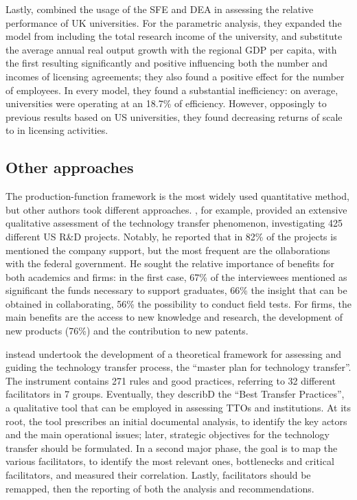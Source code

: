 Lastly, \citet{Chapple2005} combined the usage of the SFE and DEA in assessing the relative performance of UK universities. For the parametric analysis, they expanded the model from \citet{Siegel2003a} including the total research income of the university, and substitute the average annual real output growth with the regional GDP per capita, with the first resulting significantly and positive influencing both the number and incomes of licensing agreements; they also found a positive effect for the number of employees. In every model, they found a substantial inefficiency: on average, universities were operating at an 18.7\% of efficiency. However, opposingly to previous results based on US universities, they found decreasing returns of scale to in licensing activities.

\subsection{Other approaches}

The production-function framework is the most widely used quantitative method, but other authors took different approaches. \citet{Lee2000}, for example, provided an extensive qualitative assessment of the technology transfer phenomenon, investigating 425 different US R\&D projects. Notably, he reported that in 82\% of the projects is mentioned the company support, but the most frequent are the ollaborations with the federal government. He sought the relative importance of benefits for both academics and firms: in the first case, 67\% of the interviewees mentioned as significant the funds necessary to support graduates, 66\% the insight that can be obtained in collaborating, 56\% the possibility to conduct field tests. For firms, the main benefits are the access to new knowledge and research, the development of new products (76\%) and the contribution to new patents.

\citet{Resende2013} instead undertook the development of a theoretical framework for assessing and guiding the technology transfer process, the \enquote{master plan for technology transfer}. The instrument contains 271 rules and good practices, referring to 32 different facilitators in 7 groups. Eventually, they describD the \enquote{Best Transfer Practices}, a qualitative tool that can be employed in assessing TTOs and institutions. At its root, the tool prescribes an initial documental analysis, to identify the key actors and the main operational issues; later, strategic objectives for the technology transfer should be formulated. In a second major phase, the goal is to map the various facilitators, to identify the most relevant ones, bottlenecks and critical facilitators, and measured their correlation. Lastly, facilitators should be remapped, then the reporting of both the analysis and recommendations. 

